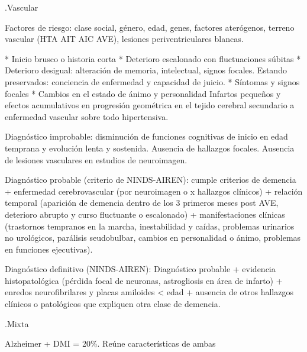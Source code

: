 .Vascular

Factores de riesgo: clase social, género, edad, genes, factores aterógenos, terreno vascular (HTA AIT AIC AVE), lesiones periventriculares blancas.

* Inicio brusco o historia corta
* Deterioro escalonado con fluctuaciones súbitas
* Deterioro desigual: alteración de memoria, intelectual, signos focales. Estando preservados: conciencia de enfermedad y capacidad de juicio.
* Síntomas y signos focales
* Cambios en el estado de ánimo y personalidad Infartos pequeños y efectos acumulativos en progresión geométrica en el tejido cerebral secundario a enfermedad vascular sobre todo hipertensiva.

Diagnóstico improbable: disminución de funciones cognitivas de inicio en edad temprana y evolución lenta y sostenida. Ausencia de hallazgos focales. Ausencia de lesiones vasculares en estudios de neuroimagen.

Diagnóstico probable (criterio de NINDS-AIREN): cumple criterios de demencia + enfermedad cerebrovascular (por neuroimagen o x hallazgos clínicos) + relación temporal (aparición de demencia dentro de los 3 primeros meses post AVE, deterioro abrupto y curso fluctuante o escalonado) + manifestaciones clínicas (trastornos tempranos en la marcha, inestabilidad y caídas, problemas urinarios no urológicos, parálisis seudobulbar, cambios en personalidad o ánimo, problemas en funciones ejecutivas).

Diagnóstico definitivo (NINDS-AIREN): Diagnóstico probable + evidencia histopatológica (pérdida focal de neuronas, astrogliosis en área de infarto) + enredos neurofibrilares y placas amiloides < edad + ausencia de otros hallazgos clínicos o patológicos que expliquen otra clase de demencia.

.Mixta

Alzheimer + DMI = 20\%. Reúne características de ambas


